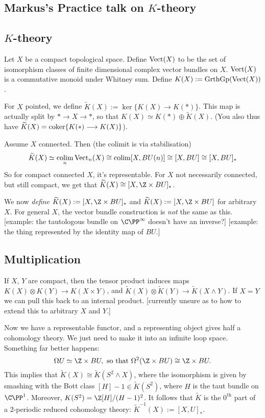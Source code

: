 \documentclass[11pt]{article}
\newcommand{\KanSemResponse}[1]
{
\thispagestyle{fancy}
\section{#1}
}
\begin{document}
\begin{MarkusKtheoryPractice}
\KanSemResponse
{Markus's Practice talk on $K$-theory}
\subsection*{$K$-theory}
Let $X$ be a compact topological space. Define $\operatorname{Vect}(X)$ to be the set of isomorphism classes of finite dimensional complex vector bundles on $X$. $\operatorname{Vect}(X)$ is a commutative monoid under Whitney sum. Define $K(X):=\operatorname{GrthGp}(\operatorname{Vect}(X))$.

For $X$ pointed, we define $\widetilde K(X):=\ker\{K(X)\to K(\ast)\}$. This map is actually split by $\ast\to X\to \ast$, so that $K(X)\simeq K(\ast)\oplus\widetilde K(X)$. (You also thus have $\widetilde K(X)=\operatorname{coker}\{K(\ast)\longrightarrow K(X)\}$).

Assume $X$ connected. Then (the colimit is via stabilisation) 
\[\widetilde K(X)\simeq \operatorname*{colim}_n\operatorname{Vect}_n(X)\cong \operatorname*{colim}[X,BU(n)]\cong[X,BU]\cong[X,BU]_*\]
So for compact connected $X$, it's representable. For $X$ not necessarily connected, but still compact, we get that $\widetilde K(X)\cong[X,\Z\times BU]_*$.

We now \emph{define} $\widetilde K(X):=[X,\Z\times BU]_*$ and $\widetilde K(X):=[X,\Z\times BU]$ for arbitrary $X$. For general $X$, the vector bundle construction is \emph{not} the same as this. [example: the tautologous bundle on $\CP^\infty$ doesn't have an inverse?] [example: the thing represented by the identity map of $BU$.]
\subsection*{Multiplication}
If $X$, $Y$ are compact, then the tensor product induces maps $K(X)\otimes K(Y)\to K(X\times Y)$, and $\widetilde K(X)\otimes \widetilde K(Y)\to\widetilde K(X\wedge Y)$. If $X=Y$ we can pull this back to an internal product. [currently unsure as to how to extend this to arbitrary $X$ and $Y$.]

Now we have a representable functor, and a representing object gives half a cohomology theory. We just need to make it into an infinite loop space. Something far better happens:
\[\Omega U\simeq\Z\times BU,\text{ so that }\Omega^2(\Z\times BU)\cong \Z\times BU.\]
This implies that $\widetilde K(X)\cong \widetilde K(S^2\wedge X)$, where the isomorphism is given by smashing with the Bott class $[H]-1\in\widetilde K(S^2)$, where $H$ is the taut bundle on $\CP^1$. Moreover, $K(S^2)=\Z[H]/(H-1)^2$. It follows that $\widetilde K$ is the $0^\text{th}$ part of a 2-periodic reduced cohomology theory: $\widetilde K^{-1}(X):=[X,U]_*$.


\end{MarkusKtheoryPractice}
\end{document}
